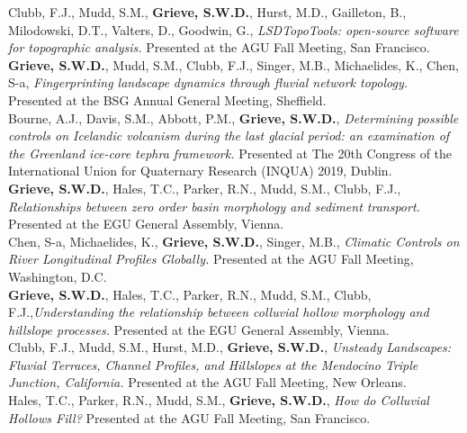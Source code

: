 \documentclass[10pt, a4paper]{article}
\newcommand{\years}[1]{\marginnote{\scriptsize #1}}
\begin{document}
\years{2019}Clubb, F.J., Mudd, S.M., \textbf{Grieve, S.W.D.}, Hurst, M.D., Gailleton, B., Milodowski, D.T., Valters, D., Goodwin, G., \textit{LSDTopoTools: open-source software for topographic analysis.} Presented at the AGU Fall Meeting, San Francisco.\\[0.05cm]

\years{2019}\textbf{Grieve, S.W.D.}, Mudd, S.M., Clubb, F.J., Singer, M.B., Michaelides, K., Chen, S-a, \textit{Fingerprinting landscape dynamics through fluvial network topology.} Presented at the BSG Annual General Meeting, Sheffield.\\[0.05cm]

\years{2019}Bourne, A.J., Davis, S.M., Abbott, P.M., \textbf{Grieve, S.W.D.}, \textit{Determining possible controls on Icelandic volcanism during the last glacial period: an examination of the Greenland ice-core tephra framework.} Presented at The 20th Congress of the International Union for Quaternary Research (INQUA) 2019, Dublin.\\[0.05cm]

\years{2019}\textbf{Grieve, S.W.D.}, Hales, T.C., Parker, R.N., Mudd, S.M., Clubb, F.J., \textit{Relationships between zero order basin morphology and sediment transport.} Presented at the EGU General Assembly, Vienna.\\[0.05cm]

\years{2018}Chen, S-a, Michaelides, K., \textbf{Grieve, S.W.D.}, Singer, M.B., \textit{Climatic Controls on River Longitudinal Profiles Globally.} Presented at the AGU Fall Meeting, Washington, D.C.\\[0.05cm]

\years{2018}\textbf{Grieve, S.W.D.}, Hales, T.C., Parker, R.N., Mudd, S.M., Clubb, F.J.,\textit{Understanding the relationship between colluvial hollow morphology and hillslope processes.} Presented at the EGU General Assembly, Vienna.\\[0.05cm]

\years{2017}Clubb, F.J., Mudd, S.M., Hurst, M.D., \textbf{Grieve, S.W.D.}, \textit{Unsteady Landscapes: Fluvial Terraces, Channel Profiles, and Hillslopes at the Mendocino Triple Junction, California.} Presented at the AGU Fall Meeting, New Orleans.\\[0.05cm]

\years{2016}Hales, T.C., Parker, R.N., Mudd, S.M., \textbf{Grieve, S.W.D.}, \textit{How do Colluvial Hollows Fill?} Presented at the AGU Fall Meeting, San Francisco.\\[0.05cm]
\end{document}
